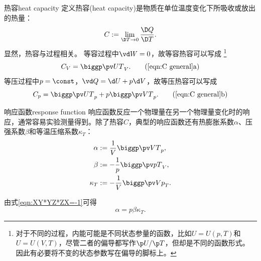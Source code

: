 \begin{definition}{热容}{heat capacity}
	定义热容(heat capacity)是物质在单位温度变化下所吸收或放出的热量：
	\begin{equation}
		\label{eqn:C general}
		C:=\lim_{\D T\to0}\frac{\D Q}{\D T}.
	\end{equation}
	显然，热容与过程相关。
	等容过程中$\vd W=0$，故等容热容可以写成
	\footnote{对于不同的过程，内能可能是不同状态参量的函数，比如$U=U(p,T)$和$U=U(V,T)$，尽管二者的偏导都写作$\p U/\p T$，但却是不同的函数形式。
	因此有必要将不变的状态参数写在偏导的脚标上。}
	\begin{equation}
		\label{eqn:C_V}
		C_V=\pu[V]UT.
		\tag{\ref{eqn:C general}a}
	\end{equation}
	等压过程中$p=\const$，$\vd Q=\d U+p\d V$，故等压热容可以写成
	\begin{equation}
		\label{eqn:C_p}
		C_p=\pu[p]UT+p\pu[p]VT.
		\tag{\ref{eqn:C general}b}
	\end{equation}
\end{definition}

\begin{definition}
	{响应函数}{response function}
	响应函数反应一个物理量在另一个物理量变化时的响应，通常容易实验测量得到。除了热容$C$，典型的响应函数还有热膨胀系数$\alpha$、压强系数$\beta$和等温压缩系数$\kappa_T$：
	\begin{subequations}
		\begin{align}
			\alpha&:=\frac1V\pu[p]VT,\\
			\beta&:=-\frac1p\pu[V]pT,\\
			\kappa_T&:=-\frac1V\pu[T]Vp.
		\end{align}
	\end{subequations}
\end{definition}

\begin{corollary}
	由式\eqref{eqn:XY*YZ*ZX=-1}可得
	\begin{equation}
		\alpha=p\beta\kappa_T.
	\end{equation}
\end{corollary}



